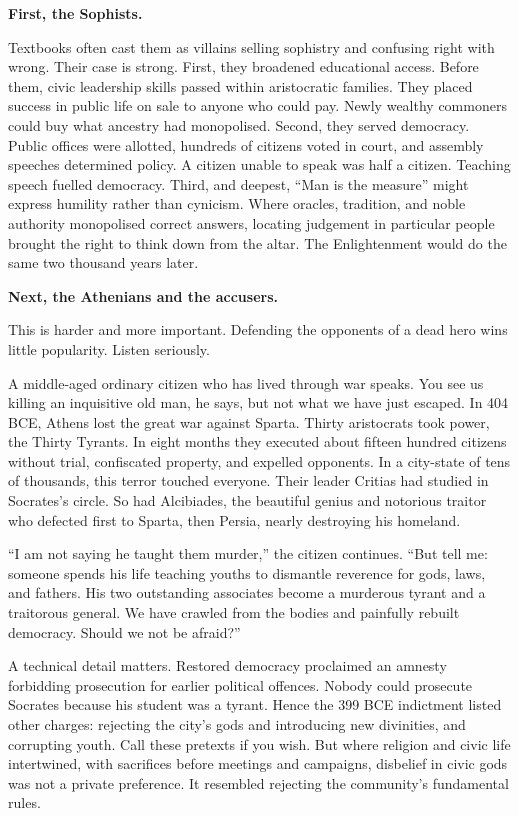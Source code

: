 \textbf{First, the Sophists.}

Textbooks often cast them as villains selling sophistry and confusing right with wrong. Their case is strong. First, they broadened educational access. Before them, civic leadership skills passed within aristocratic families. They placed success in public life on sale to anyone who could pay. Newly wealthy commoners could buy what ancestry had monopolised. Second, they served democracy. Public offices were allotted, hundreds of citizens voted in court, and assembly speeches determined policy. A citizen unable to speak was half a citizen. Teaching speech fuelled democracy. Third, and deepest, ``Man is the measure'' might express humility rather than cynicism. Where oracles, tradition, and noble authority monopolised correct answers, locating judgement in particular people brought the right to think down from the altar. The Enlightenment would do the same two thousand years later.

\textbf{Next, the Athenians and the accusers.}

This is harder and more important. Defending the opponents of a dead hero wins little popularity. Listen seriously.

A middle-aged ordinary citizen who has lived through war speaks. You see us killing an inquisitive old man, he says, but not what we have just escaped. In 404 BCE, Athens lost the great war against Sparta. Thirty aristocrats took power, the Thirty Tyrants. In eight months they executed about fifteen hundred citizens without trial, confiscated property, and expelled opponents. In a city-state of tens of thousands, this terror touched everyone. Their leader Critias had studied in Socrates's circle. So had Alcibiades, the beautiful genius and notorious traitor who defected first to Sparta, then Persia, nearly destroying his homeland.

``I am not saying he taught them murder,'' the citizen continues. ``But tell me: someone spends his life teaching youths to dismantle reverence for gods, laws, and fathers. His two outstanding associates become a murderous tyrant and a traitorous general. We have crawled from the bodies and painfully rebuilt democracy. Should we not be afraid?''

A technical detail matters. Restored democracy proclaimed an amnesty forbidding prosecution for earlier political offences. Nobody could prosecute Socrates because his student was a tyrant. Hence the 399 BCE indictment listed other charges: rejecting the city's gods and introducing new divinities, and corrupting youth. Call these pretexts if you wish. But where religion and civic life intertwined, with sacrifices before meetings and campaigns, disbelief in civic gods was not a private preference. It resembled rejecting the community's fundamental rules.

